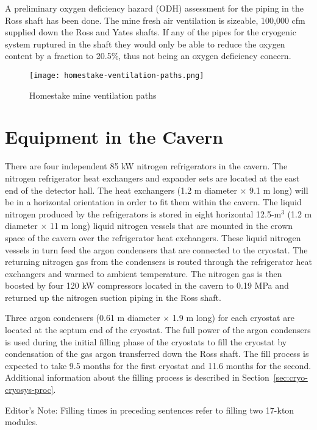 A preliminary oxygen deficiency hazard (ODH) assessment for the piping in the Ross shaft has
been done. The mine fresh air ventilation is sizeable, 100,000 cfm supplied down the Ross and
Yates shafts. If any of the pipes for the cryogenic system ruptured in the shaft they would only
be able to reduce the oxygen content by a fraction to 20.5\%, thus not being an oxygen
deficiency concern.

\begin{figure}[htbp]
\centering
\texttt{[image: homestake-ventilation-paths.png]} 
\caption{Homestake mine ventilation paths}
\label{fig:ventilation-paths}
\end{figure}


\section{Equipment in the Cavern}
\label{sec:cryo-cryosys-equip-cavern}

There are four independent 85 kW nitrogen refrigerators in the cavern. The nitrogen
refrigerator heat exchangers and expander sets are located at the east end of the detector hall.
The heat exchangers (1.2 m diameter $\times$ 9.1 m long) will be in a horizontal orientation in order to
fit them within the cavern. The liquid nitrogen produced by the refrigerators is stored in
eight horizontal 12.5-m$^3$ (1.2 m diameter $\times$ 11 m long) liquid nitrogen vessels that are mounted in the
crown space of the cavern over the refrigerator heat exchangers. These liquid nitrogen vessels
in turn feed the argon condensers that are connected to the cryostat. The returning nitrogen
gas from the condensers is routed through the refrigerator heat exchangers and warmed to
ambient temperature. The nitrogen gas is then boosted by four 120 kW compressors located in
the cavern to 0.19 MPa and returned up the nitrogen suction piping in the Ross shaft.

Three argon condensers (0.61 m diameter $\times$ 1.9 m long) for each cryostat are located at the
septum end of the cryostat. The full power of the argon condensers is used during the initial
filling phase of the cryostats to fill the cryostat by condensation of the gas argon transferred
down the Ross shaft. The fill process is expected to take 9.5 months for the first cryostat and
11.6 months for the second. Additional information about the filling process is described in
Section~\ref{sec:cryo-cryosys-proc}.  

\begin{editornote}
  Editor's Note:  Filling times in preceding sentences refer to filling two 17-kton modules.
\end{editornote}


